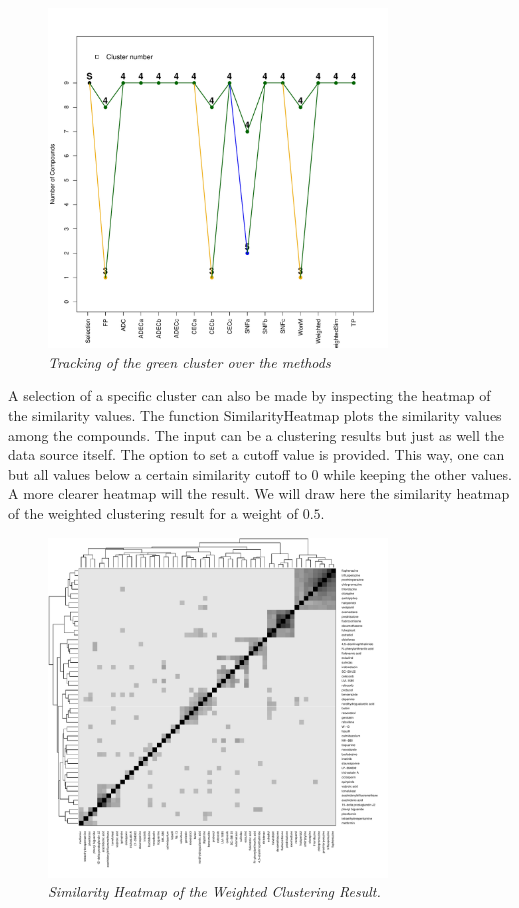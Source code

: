\documentclass[a4paper]{article}
\begin{document}
\vspace{-1.0cm}
\begin{figure}[H]
\centering
\includegraphics[width=9cm,height=9cm]{Tracking.pdf}
\caption{{\it Tracking of the green cluster over the
methods}\label{MCF7_Track}}
\end{figure}
\noindent A selection of a specific cluster can also be made by inspecting the
heatmap of the similarity values. The function SimilarityHeatmap plots the
similarity values among the compounds. The input can be a clustering results but
just as well the data source itself. The option to set a cutoff value is
provided. This way, one can but all values below a certain similarity cutoff to
0 while keeping the other values. A more clearer heatmap will the result.
We will draw here the similarity heatmap of the weighted clustering result for
a weight of $0.5$.
\begin{Schunk}
\end{Schunk}
\vspace{-1.0cm}
\begin{figure}[H]
\centering
\includegraphics[width=9cm,height=9cm]{SimilarityHeatmap_MCF7W.pdf}
\caption{{\it Similarity Heatmap of the Weighted
Clustering Result.}\label{SimMap}}
\end{figure}
\end{document}
